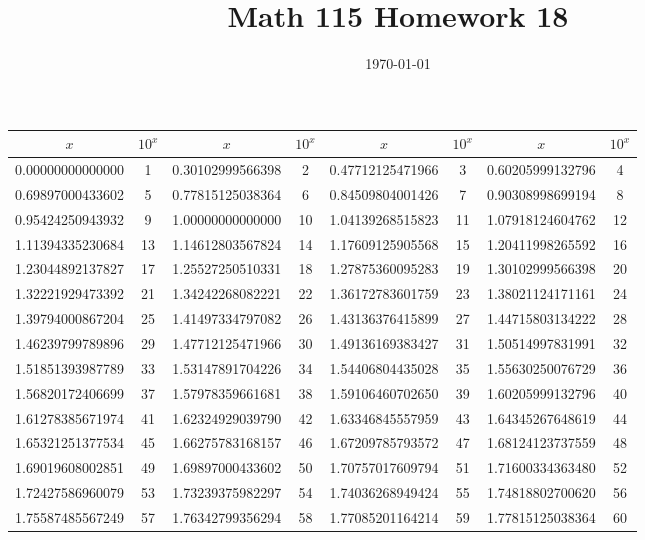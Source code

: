 \documentclass{exam}
\title{Math 115 Homework 18}
\date{\today}
\begin{document}

\begin{figure}
\centering
\begin{tabular}{|c|c||c|c||c|c||c|c|}
\hline
$x$ & $10^x$ & $x$ & $10^x$ & $x$ & $10^x$ & $x$ & $10^x$ \\
\hline
\hline

0.00000000000000 & 1 &0.30102999566398 & 2 &0.47712125471966 & 3 &0.60205999132796 & 4 \\
\hline
0.69897000433602 & 5 &0.77815125038364 & 6 &0.84509804001426 & 7 &0.90308998699194 & 8 \\
\hline
0.95424250943932 & 9 &1.00000000000000 & 10 &1.04139268515823 & 11 &1.07918124604762 & 12 \\
\hline
1.11394335230684 & 13 &1.14612803567824 & 14 &1.17609125905568 & 15 &1.20411998265592 & 16 \\
\hline
1.23044892137827 & 17 &1.25527250510331 & 18 &1.27875360095283 & 19 &1.30102999566398 & 20 \\
\hline
1.32221929473392 & 21 &1.34242268082221 & 22 &1.36172783601759 & 23 &1.38021124171161 & 24 \\
\hline
1.39794000867204 & 25 &1.41497334797082 & 26 &1.43136376415899 & 27 &1.44715803134222 & 28 \\
\hline
1.46239799789896 & 29 &1.47712125471966 & 30 &1.49136169383427 & 31 &1.50514997831991 & 32 \\
\hline
1.51851393987789 & 33 &1.53147891704226 & 34 &1.54406804435028 & 35 &1.55630250076729 & 36 \\
\hline
1.56820172406699 & 37 &1.57978359661681 & 38 &1.59106460702650 & 39 &1.60205999132796 & 40 \\
\hline
1.61278385671974 & 41 &1.62324929039790 & 42 &1.63346845557959 & 43 &1.64345267648619 & 44 \\
\hline
1.65321251377534 & 45 &1.66275783168157 & 46 &1.67209785793572 & 47 &1.68124123737559 & 48 \\
\hline
1.69019608002851 & 49 &1.69897000433602 & 50 &1.70757017609794 & 51 &1.71600334363480 & 52 \\
\hline
1.72427586960079 & 53 &1.73239375982297 & 54 &1.74036268949424 & 55 &1.74818802700620 & 56 \\
\hline
1.75587485567249 & 57 &1.76342799356294 & 58 &1.77085201164214 & 59 &1.77815125038364 & 60 \\

\end{tabular}
\end{figure}
\end{document}
